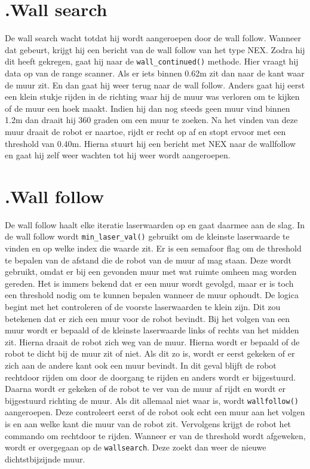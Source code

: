\documentclass[a4paper,10pt]{article}
\begin{document}
\section*{\label{wallsearch}\thesection.\quad Wall search}
De wall search wacht totdat hij wordt aangeroepen door de wall follow. Wanneer dat gebeurt, krijgt hij een bericht van de wall follow van het type NEX. Zodra hij dit heeft gekregen, gaat hij naar de \verb!wall_continued()! methode. Hier vraagt hij data op van de range scanner. Als er iets binnen 0.62m zit dan naar de kant waar de muur zit. En dan gaat hij weer terug naar de wall follow. Anders gaat hij eerst een klein stukje rijden in de richting waar hij de muur was verloren om te kijken of de muur een hoek maakt. Indien hij dan nog steeds geen muur vind binnen 1.2m dan draait hij 360 graden om een muur te zoeken. Na het vinden van deze muur draait de robot er naartoe, rijdt er recht op af en stopt ervoor met een threshold van 0.40m. Hierna stuurt hij een bericht met NEX naar de wallfollow en gaat hij zelf weer wachten tot hij weer wordt aangeroepen.

\section*{\label{wallfollow}\thesection.\quad Wall follow} De wall follow haalt elke iteratie laserwaarden op en gaat daarmee aan de slag. In de wall follow wordt \verb!min_laser_val()! gebruikt om de kleinste
laserwaarde te vinden en op welke index die waarde zit. Er is een semafoor flag om de threshold te bepalen van de afstand die de robot van de muur af mag staan. Deze wordt gebruikt, omdat er bij een gevonden muur met wat ruimte omheen mag worden gereden. Het is immers bekend dat er een muur wordt gevolgd, maar er is toch een threshold nodig om te kunnen bepalen wanneer de muur ophoudt. De logica begint met het controleren of de voorste laserwaarden te klein zijn. Dit zou betekenen dat er zich een muur voor de robot bevindt. Bij het volgen van een muur wordt er bepaald of de kleinste laserwaarde links of rechts van het midden zit. Hierna draait de robot zich weg van de muur. Hierna wordt er bepaald of de robot te dicht bij de muur zit of niet. Als dit zo is, wordt er eerst gekeken of er zich aan de andere kant ook een muur bevindt. In dit geval blijft de robot rechtdoor rijden om door de doorgang te rijden en anders wordt er bijgestuurd. Daarna wordt er gekeken of de robot te ver van de muur af rijdt en wordt er bijgestuurd richting de muur. Als dit allemaal niet waar is, wordt \verb!wallfollow()! aangeroepen. Deze controleert eerst of de robot ook echt een muur aan het volgen is en aan welke kant die muur van de robot zit. Vervolgens krijgt de robot het commando om rechtdoor te rijden. Wanneer er van de threshold wordt afgeweken, wordt er overgegaan op de \verb!wallsearch!. Deze zoekt dan weer de nieuwe dichtstbijzijnde muur. 
\end{document}
